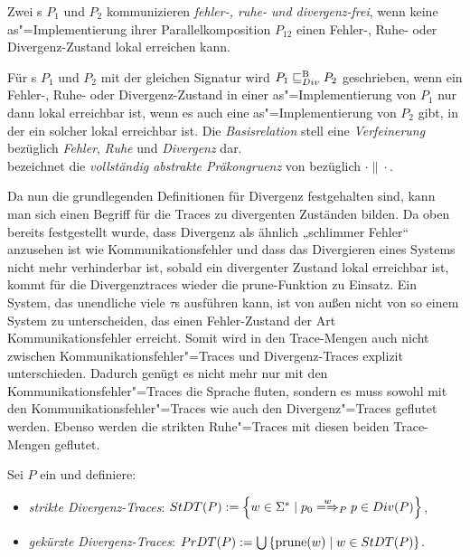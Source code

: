 \begin{Def}
  Zwei \MEIO{}s $P_1$ und $P_2$ kommunizieren \emph{fehler-, ruhe- und
  divergenz-frei}, wenn keine as"=Implementierung ihrer Parallelkomposition
  $P_{12}$ einen Fehler-, Ruhe- oder Divergenz-Zustand lokal erreichen kann.
\end{Def}

\begin{Def}
  Für \MEIO{}s $P_1$ und $P_2$ mit der gleichen Signatur wird $P_1 \sqsubseteq  _{Div}^\mathrm{B}{} P_2$
  geschrieben, wenn ein Fehler-, Ruhe- oder Divergenz-Zustand in einer
  as"=Implementierung von $P_1$ nur dann lokal erreichbar ist, wenn es auch
  eine as"=Implementierung von $P_2$ gibt, in der ein solcher lokal erreichbar
  ist. Die \emph{Basisrelation} stell eine \emph{Verfeinerung} bezüglich
  \emph{Fehler}, \emph{Ruhe} und \emph{Divergenz} dar.\\
  \DCRel{} bezeichnet die \emph{vollständig abstrakte Präkongruenz} von
  \DBRel{} bezüglich $\cdot\|\cdot$.
\end{Def}

Da nun die grundlegenden Definitionen für Divergenz festgehalten sind, kann man
sich einen Begriff für die Traces zu divergenten Zuständen bilden. Da oben
bereits festgestellt wurde, dass Divergenz als ähnlich „schlimmer Fehler“
anzusehen ist wie Kommunikationsfehler und dass das Divergieren eines Systems
nicht mehr verhinderbar ist, sobald ein divergenter Zustand lokal erreichbar
ist, kommt für die Divergenztraces wieder die prune-Funktion zu Einsatz. Ein
System, das unendliche viele $\tau$s ausführen kann, ist von außen nicht von so
einem System zu unterscheiden, das einen Fehler-Zustand der Art
Kommunikationsfehler erreicht. Somit wird in den Trace-Mengen auch nicht
zwischen Kommunikationsfehler"=Traces und Divergenz-Traces explizit
unterschieden. Dadurch genügt es nicht mehr nur mit den
Kommunikationsfehler"=Traces die Sprache fluten, sondern es muss sowohl mit den
Kommunikationsfehler"=Traces wie auch den Divergenz"=Traces geflutet werden.
Ebenso werden die strikten Ruhe"=Traces mit diesen beiden Trace-Mengen
geflutet.

\begin{Def}
  Sei $P$ ein \MEIO{} und definiere:
  \begin{itemize}
    \item \emph{strikte Divergenz-Traces}: $\StDT (P) := \left\{w\in\Sigma
      ^*\mid p_0\weakmay[w]_P p\in Div(P)\right\}$,
    \item \emph{gekürzte Divergenz-Traces}: $PrDT (P) := \bigcup\left\{\mathrm{prune}
      (w)\mid w\in StDT (P)\right\}$.
  \end{itemize}
\end{Def}

